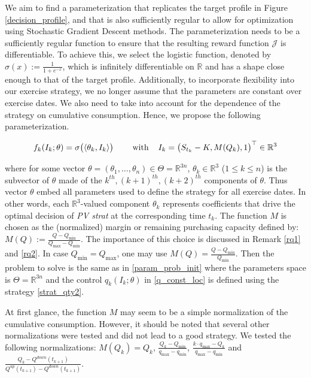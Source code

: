 \documentclass{article}
\numberwithin{equation}{section}
\begin{document}
\indent

We aim to find a parameterization that replicates the target profile in Figure \ref{decision_profile}, and that is also sufficiently regular to allow for optimization using Stochastic Gradient Descent methods. The parameterization needs to be a sufficiently regular function to ensure that the resulting reward function $\mathcal{J}$ is differentiable. To achieve this, we select the logistic function, denoted by $\sigma(x) := \frac{1}{1+e^{-x}}$, which is infinitely differentiable on $\mathbb{R}$ and has a shape close enough to that of the target profile. Additionally, to incorporate flexibility into our exercise strategy, we no longer assume that the parameters are constant over exercise dates. We also need to take into account for the dependence of the strategy on cumulative consumption. Hence, we propose the following parameterization.

    \begin{equation}
        f_{k}(I_k; \theta) = \sigma\big(\langle \theta_k, I_k \rangle  \big)  \hspace{0.8cm} \text{with} \hspace{0.4cm} I_k = \big(S_{t_k} - K, M(Q_k), 1\big)^\top \in \mathbb{R}^3
        \label{strat_qty2}
    \end{equation}
    
\noindent
where for some vector $\theta = (\theta_1, \ldots, \theta_n) \in \Theta = \mathbb{R}^{3n}$, $\theta_k \in \mathbb{R}^3$ ($1 \le k \le n$) is the subvector of $\theta$ made of the $k^{th},(k+1)^{th}, (k+2)^{th}$ components of $\theta$. Thus vector $\theta$ embed all parameters used to define the strategy for all exercise dates. In other words, each $\mathbb{R}^3$-valued component $\theta_k$ represents coefficients that drive the optimal decision of \textit{PV strat} at the corresponding time $t_k$. The function $M$ is chosen as the (normalized) margin or remaining purchasing capacity defined by: $M(Q) := \frac{Q-Q_{\min}}{Q_{\max} - Q_{\min}}$. The importance of this choice is discussed in Remark \ref{rq1} and \ref{rq2}. In case $Q_{\min} = Q_{\max}$, one may use $M(Q) =\frac{Q-Q_{\min}}{Q_{\min}}$. Then the problem to solve is the same as in \eqref{param_prob_init} where the parameters space is $\Theta = \mathbb{R}^{3n}$ and the control $q_k(I_k; \theta)$ in \eqref{q_const_loc} is defined using the strategy \eqref{strat_qty2}.

\begin{remark}
\label{rq1}
At first glance, the function $M$ may seem to be a simple normalization of the cumulative consumption. However, it should be noted that several other normalizations were tested and did not lead to a good strategy. We tested the following normalizations: $M(Q_k) = Q_k$, $\frac{Q_k - Q_{\min}}{q_{\max} - q_{\min}}$, $\frac{k \cdot q_{\max} - Q_k}{q_{\max} - q_{\min}}$ and $\frac{Q_k - Q^{down}(t_{k+1})}{Q^{up}(t_{k+1}) - Q^{down}(t_{k+1})}$.
\end{remark}
\end{document}
